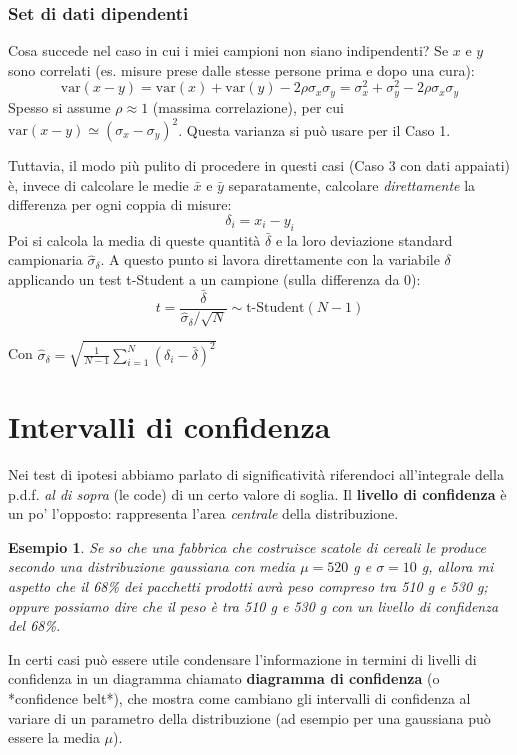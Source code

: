 \documentclass[openany,a4paper,12pt]{book}
\newtheorem{esempio}{Esempio}
\theoremstyle{remark}
\begin{document}
\subsubsection*{Set di dati dipendenti}
Cosa succede nel caso in cui i miei campioni non siano indipendenti? Se $x$ e $y$ sono correlati (es. misure prese dalle stesse persone prima e dopo una cura):
$$ \text{var}(x-y) = \text{var}(x) + \text{var}(y) - 2\rho \sigma_x \sigma_y = \sigma_x^2 + \sigma_y^2 - 2\rho \sigma_x \sigma_y $$
Spesso si assume $\rho \approx 1$ (massima correlazione), per cui $\text{var}(x-y) \simeq (\sigma_x - \sigma_y)^2$. Questa varianza si può usare per il Caso 1.

Tuttavia, il modo più pulito di procedere in questi casi (Caso 3 con dati appaiati) è, invece di calcolare le medie $\bar{x}$ e $\bar{y}$ separatamente, calcolare \textit{direttamente} la differenza per ogni coppia di misure:
$$ \delta_i = x_i - y_i $$
Poi si calcola la media di queste quantità $\bar{\delta}$ e la loro deviazione standard campionaria $\hat{\sigma}_\delta$. A questo punto si lavora direttamente con la variabile $\delta$ applicando un test t-Student a un campione (sulla differenza da 0):
$$ t = \frac{\bar{\delta}}{\hat{\sigma}_\delta / \sqrt{N}} \sim \text{t-Student}(N-1) $$ 

Con $\hat{\sigma}_{\delta} = \sqrt{\frac{1}{N-1} \sum_{i=1}^N (\delta_i - \bar{\delta})^2}$

\section*{Intervalli di confidenza}
Nei test di ipotesi abbiamo parlato di significatività riferendoci all'integrale della p.d.f. \textit{al di sopra} (le code) di un certo valore di soglia.
Il \textbf{livello di confidenza} è un po' l'opposto: rappresenta l'area \textit{centrale} della distribuzione.


\begin{esempio}
Se so che una fabbrica che costruisce scatole di cereali le produce secondo una distribuzione gaussiana con media $\mu = 520$ g e $\sigma = 10$ g, allora mi aspetto che il 68\% dei pacchetti prodotti avrà peso compreso tra 510 g e 530 g; oppure possiamo dire che il peso è tra 510 g e 530 g \textit{con un livello di confidenza del 68\%}.
\end{esempio}

In certi casi può essere utile condensare l'informazione in termini di livelli di confidenza in un diagramma chiamato \textbf{diagramma di confidenza} (o *confidence belt*), che mostra come cambiano gli intervalli di confidenza al variare di un parametro della distribuzione (ad esempio per una gaussiana può essere la media $\mu$).
\end{document}

